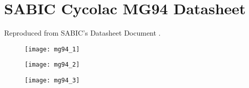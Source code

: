 \documentclass[main.tex]{subfiles}
\begin{document}
	\chapter{SABIC Cycolac MG94 Datasheet}\label{ch:mg94}

Reproduced from SABIC's Datasheet Document \cite{sabic2016}.
	
	\begin{figure}[h]
		\center
		\texttt{[image: mg94\_1]}
		\label{fig:mg941}
	\end{figure}

	\begin{figure}[h]
		\center
		\texttt{[image: mg94\_2]}
		\label{fig:mg942}
	\end{figure}

	\begin{figure}[h]
	\center
	\texttt{[image: mg94\_3]}
	\label{fig:mg943}
	\end{figure}
\end{document}
